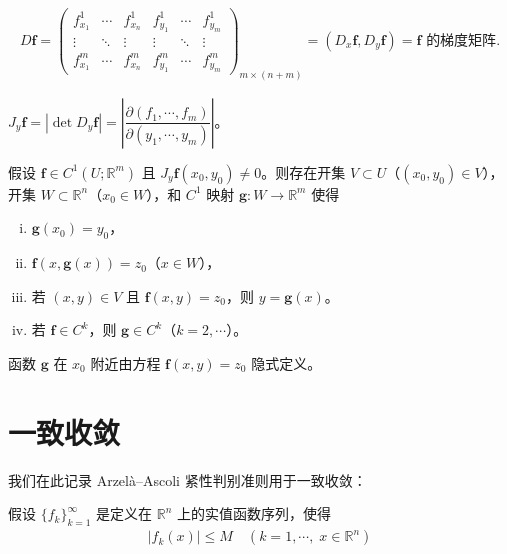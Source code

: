 \documentclass[../main.tex]{subfiles}
\begin{document}
\begin{definition}\label{notation:appC-Df}
\begin{align*}
D\mathbf{f}=\begin{pmatrix}
f^1_{x_1} & \cdots & f^1_{x_n} & f^1_{y_1} & \cdots & f^1_{y_m}\\
\vdots & \ddots & \vdots & \vdots & \ddots & \vdots\\
f^m_{x_1} & \cdots & f^m_{x_n} & f^m_{y_1} & \cdots & f^m_{y_m}
\end{pmatrix}_{m\times(n+m)}=(D_x\mathbf{f},D_y\mathbf{f})=\mathbf{f}\text{ 的梯度矩阵}.
\end{align*}
\end{definition}

\begin{definition}\label{definition:appC-Jyf}
$J_y\mathbf{f}=|\det D_y\mathbf{f}|=\left|\dfrac{\partial(f_1,\cdots,f_m)}{\partial(y_1,\cdots,y_m)}\right|$。
\end{definition}

\begin{theorem}[隐函数定理。]\label{theorem:appC-隐函数}假设 $\mathbf{f}\in C^1(U;\mathbb{R}^m)$ 且 $J_y\mathbf{f}(x_0,y_0)\neq 0$。则存在开集 $V\subset U$（$(x_0,y_0)\in V$），开集 $W\subset\mathbb{R}^n$（$x_0\in W$），和 $C^1$ 映射 $\mathbf{g}:W\to\mathbb{R}^m$ 使得
\begin{enumerate}[(i)]
\item $\mathbf{g}(x_0)=y_0$，
\item $\mathbf{f}(x,\mathbf{g}(x))=z_0$（$x\in W$），
\item 若 $(x,y)\in V$ 且 $\mathbf{f}(x,y)=z_0$，则 $y=\mathbf{g}(x)$。
\item 若 $\mathbf{f}\in C^k$，则 $\mathbf{g}\in C^k$（$k=2,\cdots$）。
\end{enumerate}
函数 $\mathbf{g}$ 在 $x_0$ 附近由方程 $\mathbf{f}(x,y)=z_0$ 隐式定义。
\end{theorem}

\section{一致收敛}\label{section:appC-一致收敛}

我们在此记录 Arzel\`a--Ascoli 紧性判别准则用于一致收敛：

假设 $\{f_k\}_{k=1}^\infty$ 是定义在 $\mathbb{R}^n$ 上的实值函数序列，使得
\begin{align*}
|f_k(x)|\leqslant M \quad (k=1,\cdots,\;x\in\mathbb{R}^n)
\end{align*}
\end{document}
